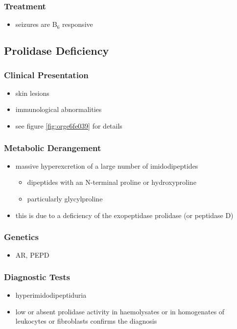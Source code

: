 \documentclass{scrartcl}
\begin{document}
\subsubsection{Treatment}
\label{sec:org393e4c5}
\begin{itemize}
\item seizures are B\(_{\text{6}}\) responsive
\end{itemize}

\subsection{Prolidase Deficiency}
\label{sec:org04334f6}
\subsubsection{Clinical Presentation}
\label{sec:orgb713924}
\begin{itemize}
\item skin lesions
\item immunological abnormalities
\item see figure \ref{fig:orge6fe039} for details
\end{itemize}
\subsubsection{Metabolic Derangement}
\label{sec:orgc559a79}
\begin{itemize}
\item massive hyperexcretion of a large number of imidodipeptides
\begin{itemize}
\item dipeptides with an N-terminal proline or hydroxyproline
\item particularly glycylproline
\end{itemize}
\item this is due to a deficiency of the exopeptidase prolidase (or
peptidase D)
\end{itemize}
\subsubsection{Genetics}
\label{sec:orgd9f330b}
\begin{itemize}
\item AR, PEPD
\end{itemize}
\subsubsection{Diagnostic Tests}
\label{sec:orgaec756c}
\begin{itemize}
\item hyperimidodipeptiduria
\item low or absent prolidase activity in haemolysates or in homogenates
of leukocytes or fibroblasts confirms the diagnosis
\end{itemize}
\end{document}
